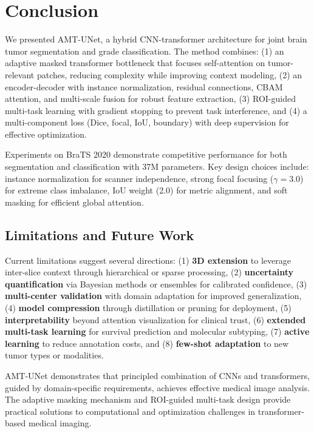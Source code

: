 \section{Conclusion}

We presented AMT-UNet, a hybrid CNN-transformer architecture for joint brain tumor segmentation and grade classification. The method combines: (1) an adaptive masked transformer bottleneck that focuses self-attention on tumor-relevant patches, reducing complexity while improving context modeling, (2) an encoder-decoder with instance normalization, residual connections, CBAM attention, and multi-scale fusion for robust feature extraction, (3) ROI-guided multi-task learning with gradient stopping to prevent task interference, and (4) a multi-component loss (Dice, focal, IoU, boundary) with deep supervision for effective optimization.

Experiments on BraTS 2020 demonstrate competitive performance for both segmentation and classification with 37M parameters. Key design choices include: instance normalization for scanner independence, strong focal focusing ($\gamma=3.0$) for extreme class imbalance, IoU weight (2.0) for metric alignment, and soft masking for efficient global attention.

\subsection{Limitations and Future Work}

Current limitations suggest several directions: (1) \textbf{3D extension} to leverage inter-slice context through hierarchical or sparse processing, (2) \textbf{uncertainty quantification} via Bayesian methods or ensembles for calibrated confidence, (3) \textbf{multi-center validation} with domain adaptation for improved generalization, (4) \textbf{model compression} through distillation or pruning for deployment, (5) \textbf{interpretability} beyond attention visualization for clinical trust, (6) \textbf{extended multi-task learning} for survival prediction and molecular subtyping, (7) \textbf{active learning} to reduce annotation costs, and (8) \textbf{few-shot adaptation} to new tumor types or modalities.

AMT-UNet demonstrates that principled combination of CNNs and transformers, guided by domain-specific requirements, achieves effective medical image analysis. The adaptive masking mechanism and ROI-guided multi-task design provide practical solutions to computational and optimization challenges in transformer-based medical imaging.

